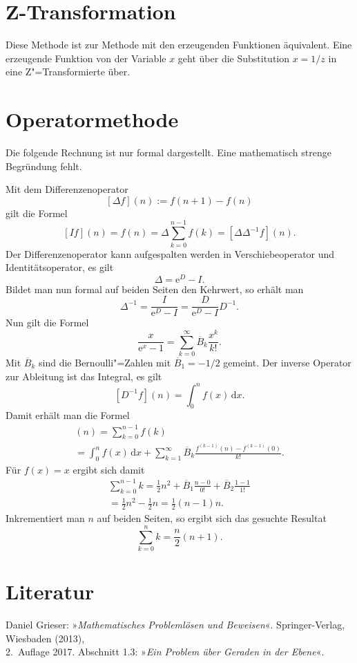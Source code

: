 \documentclass[a4paper,11pt,fleqn,twocolumn,twoside]{scrartcl}
\newcommand{\ee}{\mathrm{e}}
\begin{document}
\section{Z-Transformation}

Diese Methode ist zur Methode mit den erzeugenden
Funktionen äquivalent. Eine erzeugende Funktion von der
Variable $x$ geht über die Substitution $x=1/z$ in
eine Z"=Transformierte über.

\section{Operatormethode}

Die folgende Rechnung ist nur formal dargestellt. Eine
mathematisch strenge Begründung fehlt.

Mit dem Differenzenoperator
\[[\Delta f](n) := f(n+1)-f(n)\]
gilt die Formel
\[[If](n) = f(n) = \Delta\sum_{k=0}^{n-1}f(k)
= [\Delta\Delta^{-1}f](n).\]
Der Differenzenoperator kann aufgespalten werden in
Verschiebeoperator und Identitätsoperator, es gilt%
\[\Delta = \ee^D-I.\]
Bildet man nun formal auf beiden Seiten den Kehrwert,
so erhält man%
\[\Delta^{-1} = \frac{I}{\ee^D-I} = \frac{D}{\ee^D-I}D^{-1}.\]
Nun gilt die Formel
\[\frac{x}{\ee^x-1} = \sum_{k=0}^\infty \overline{B}_k \frac{x^k}{k!}.\]
Mit $\overline{B}_k$ sind die Bernoulli"=Zahlen mit
$\overline{B}_1=-1/2$ gemeint.
Der inverse Operator zur Ableitung ist das Integral, es gilt%
\[[D^{-1}f](n) = \int_0^n f(x)\,\mathrm dx.\]
Damit erhält man die Formel
\begin{gather*}
[\Delta^{-1} f](n) = \sum_{k=0}^{n-1} f(k)\\
= \int_0^n f(x)\,\mathrm dx
+ \sum_{k=1}^\infty \overline{B}_k
\frac{f^{(k-1)}(n)-f^{(k-1)}(0)}{k!}.
\end{gather*}
Für $f(x)=x$ ergibt sich damit
\begin{gather*}
\sum_{k=0}^{n-1}k
= \frac{1}{2}n^2+\overline{B}_1 \frac{n-0}{0!}
+\overline{B}_2 \frac{1-1}{1!}\\
= \frac{1}{2}n^2-\frac{1}{2}n
= \frac{1}{2}(n-1)n.
\end{gather*}
Inkrementiert man $n$ auf beiden Seiten, so ergibt sich das
gesuchte Resultat%
\[\sum_{k=0}^n k = \frac{n}{2}(n+1).\]

\newpage
\section*{Literatur}

\noindent
[1] Daniel Grieser: »\emph{Mathematisches Problemlösen und Beweisen}«.
Springer-Verlag, Wiesbaden (2013),\\
2.~Auflage 2017.
Abschnitt 1.3: »\emph{Ein Problem über Geraden in der Ebene}«.
\end{document}
